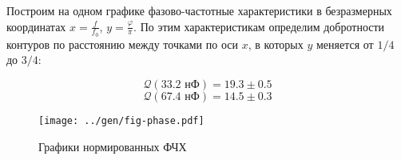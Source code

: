 Построим на одном графике фазово-частотные характеристики в безразмерных координатах $x = \frac{f}{f_0}$, $y = \frac{\varphi}{\pi}$. По этим характеристикам определим добротности контуров по расстоянию между точками по оси $x$, в которых $y$ меняется от $1/4$ до $3/4$:

$$\mathcal{Q}\left(33.2 \text{ нФ}\right) = 19.3 \pm 0.5$$
$$\mathcal{Q}\left(67.4 \text{ нФ}\right) = 14.5 \pm 0.3$$


%	



\begin{figure}[H]
	\centering
	\texttt{[image: ../gen/fig-phase.pdf]}
	\caption{Графики нормированных ФЧХ}
\end{figure}
